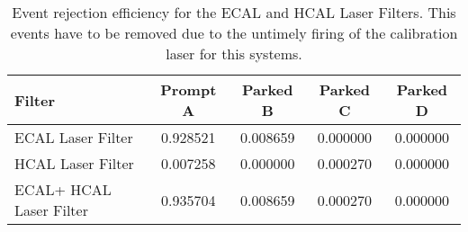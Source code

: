 \begin{table}[!htp]
\centering

\begin{tabular}{|l||c|c|c|c|}
\hline
Filter                  & Prompt A & Parked B & Parked C & Parked D \\
\hline \hline
ECAL Laser Filter       & 0.928521 & 0.008659 & 0.000000 & 0.000000 \\
HCAL Laser Filter       & 0.007258 & 0.000000 & 0.000270 & 0.000000 \\
\hline
ECAL+ HCAL Laser Filter & 0.935704 & 0.008659 & 0.000270 & 0.000000 \\
\hline
\end{tabular}

\caption{Event rejection efficiency for the ECAL and HCAL Laser Filters. This events have to be removed due to the untimely firing of the calibration laser for this systems.}
\label{table_CaloLaserFilterEff}
\end{table}
